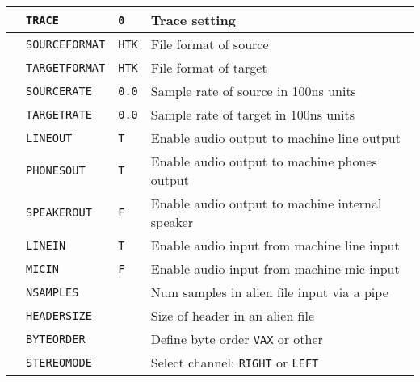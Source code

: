 \begin{center}
\tabletail{\hline}
\begin{supertabular}{|p{1.8cm}|l|l|p{6.6cm}|}

  & \texttt{TRACE} & \texttt{0} & Trace setting\\ \hline

 & \texttt{SOURCEFORMAT} & \texttt{HTK}
  & File format of source \\ 
 & \texttt{TARGETFORMAT} & \texttt{HTK} & File format of target \\ \hline

    
  & \texttt{SOURCERATE} & \texttt{0.0} & Sample rate of source in 100ns units \\ \hline

  
  & \texttt{TARGETRATE} & \texttt{0.0} & Sample rate of target in 100ns units \\ \hline

  & \texttt{LINEOUT} & \texttt{T}   & Enable audio output to machine line output \\ 
  & \texttt{PHONESOUT} & \texttt{T} & Enable audio output to machine phones output \\ 
  & \texttt{SPEAKEROUT} & \texttt{F}& Enable audio output to machine internal speaker \\ 
  & \texttt{LINEIN} & \texttt{T} & Enable audio input from machine line input \\ 
  & \texttt{MICIN}  & \texttt{F} & Enable audio input from machine mic input \\ \hline

  & \texttt{NSAMPLES} &  & Num samples in alien file input via a pipe\\ 
 & \texttt{HEADERSIZE}  &   & Size of header in an alien file\\ 
  & \texttt{BYTEORDER} &   & Define byte order \texttt{VAX} or other\\ 
  & \texttt{STEREOMODE} &   & Select channel: \texttt{RIGHT} or \texttt{LEFT} \\ \hline


\end{supertabular}
\end{center}
